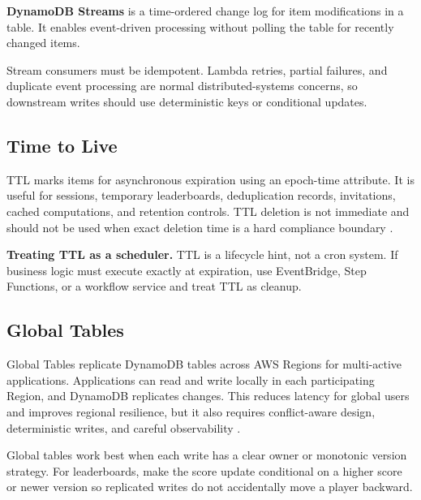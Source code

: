 \begin{definitionbox}
\textbf{DynamoDB Streams} is a time-ordered change log for item modifications in a table. It enables event-driven processing without polling the table for recently changed items.
\end{definitionbox}

\begin{notebox}
Stream consumers must be idempotent. Lambda retries, partial failures, and duplicate event processing are normal distributed-systems concerns, so downstream writes should use deterministic keys or conditional updates.
\end{notebox}

\subsection{Time to Live}
TTL marks items for asynchronous expiration using an epoch-time attribute. It is useful for sessions, temporary leaderboards, deduplication records, invitations, cached computations, and retention controls. TTL deletion is not immediate and should not be used when exact deletion time is a hard compliance boundary \cite{awsDynamoDBStreamsTTL}.

\begin{pitfall}
\textbf{Treating TTL as a scheduler.} TTL is a lifecycle hint, not a cron system. If business logic must execute exactly at expiration, use EventBridge, Step Functions, or a workflow service and treat TTL as cleanup.
\end{pitfall}

\subsection{Global Tables}
Global Tables replicate DynamoDB tables across AWS Regions for multi-active applications. Applications can read and write locally in each participating Region, and DynamoDB replicates changes. This reduces latency for global users and improves regional resilience, but it also requires conflict-aware design, deterministic writes, and careful observability \cite{awsDynamoDBGlobalTables}.

\begin{tipbox}
Global tables work best when each write has a clear owner or monotonic version strategy. For leaderboards, make the score update conditional on a higher score or newer version so replicated writes do not accidentally move a player backward.
\end{tipbox}

